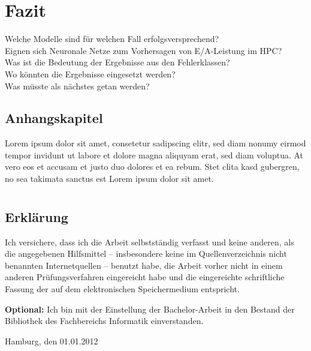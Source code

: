 \documentclass[
	12pt,
	a4paper,
	BCOR10mm,
	DIV14,
	listof=totoc,
	bibliography=totoc,
	headsepline
]{scrreprt}
\begin{document}
\chapter{Fazit}
\label{Fazit}
Welche Modelle sind für welchen Fall erfolgsversprechend?\\
Eignen sich Neuronale Netze zum Vorhersagen von E/A-Leistung im HPC?\\
Was ist die Bedeutung der Ergebnisse aus den Fehlerklassen?\\
Wo könnten die Ergebnisse eingesetzt werden?\\
Was müsste als nächstes getan werden?\\




\listoffigures

\listoftables

\lstlistoflistings

\begin{appendices}

\chapter{Anhangskapitel}

Lorem ipsum dolor sit amet, consetetur sadipscing elitr, sed diam nonumy eirmod tempor invidunt ut labore et dolore magna aliquyam erat, sed diam voluptua.
At vero eos et accusam et justo duo dolores et ea rebum.
Stet clita kasd gubergren, no sea takimata sanctus est Lorem ipsum dolor sit amet.

\end{appendices}

\newpage

\thispagestyle{empty}

\chapter*{}

\section*{Erklärung}

Ich versichere, dass ich die Arbeit selbstständig verfasst und keine anderen, als die angegebenen Hilfsmittel -- insbesondere keine im Quellenverzeichnis nicht benannten Internetquellen -- benutzt habe, die Arbeit vorher nicht in einem anderen Prüfungsverfahren eingereicht habe und die eingereichte schriftliche Fassung der auf dem elektronischen Speichermedium entspricht.

\smallskip

\textbf{Optional:} Ich bin mit der Einstellung der Bachelor-Arbeit in den Bestand der Bibliothek des Fachbereichs Informatik einverstanden.

\bigskip
\bigskip
\bigskip

Hamburg, den 01.01.2012  \quad \dotfill
\end{document}
